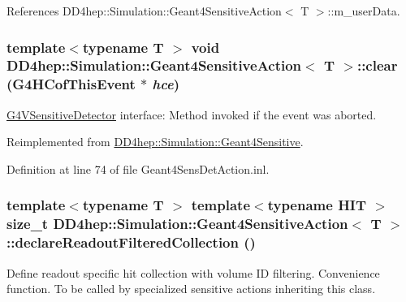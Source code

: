 References DD4hep::Simulation::Geant4SensitiveAction$<$ T $>$::m\_\-userData.\hypertarget{class_d_d4hep_1_1_simulation_1_1_geant4_sensitive_action_a52a9e46a54f3e1605637dc281a878b0d}{
\subsubsection[{clear}]{\setlength{\rightskip}{0pt plus 5cm}template$<$typename T $>$ void {\bf DD4hep::Simulation::Geant4SensitiveAction}$<$ T $>$::clear (G4HCofThisEvent $\ast$ {\em hce})}}
\label{class_d_d4hep_1_1_simulation_1_1_geant4_sensitive_action_a52a9e46a54f3e1605637dc281a878b0d}


\hyperlink{class_g4_v_sensitive_detector}{G4VSensitiveDetector} interface: Method invoked if the event was aborted. 

Reimplemented from \hyperlink{class_d_d4hep_1_1_simulation_1_1_geant4_sensitive_a3bb1c2f79261a98e83ec22102281d117}{DD4hep::Simulation::Geant4Sensitive}.

Definition at line 74 of file Geant4SensDetAction.inl.\hypertarget{class_d_d4hep_1_1_simulation_1_1_geant4_sensitive_action_a0a2a07e65f4808da39312569b32145ac}{
\subsubsection[{declareReadoutFilteredCollection}]{\setlength{\rightskip}{0pt plus 5cm}template$<$typename T $>$ template$<$typename HIT $>$ size\_\-t {\bf DD4hep::Simulation::Geant4SensitiveAction}$<$ T $>$::declareReadoutFilteredCollection ()}}
\label{class_d_d4hep_1_1_simulation_1_1_geant4_sensitive_action_a0a2a07e65f4808da39312569b32145ac}


Define readout specific hit collection with volume ID filtering. Convenience function. To be called by specialized sensitive actions inheriting this class.


